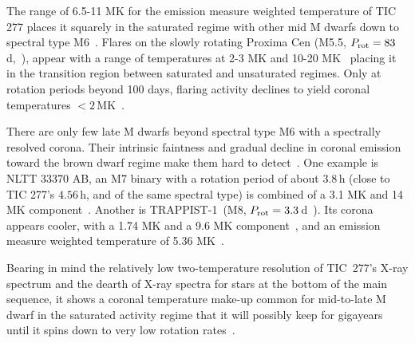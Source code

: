 \documentclass[twocolumn]{aastex631}
\begin{document}
The range of 6.5-11 MK for the emission measure weighted temperature of TIC 277 places it squarely in the saturated regime with other mid M dwarfs down to spectral type M6~\citep{wright2018stellar, magaudda2020relation, stelzer2022first,robrade2005xray,raassen2003xray,paudel2021simultaneous, foster2020corona}. Flares on the slowly rotating Proxima Cen (M5.5, $P_{\rm rot} = 83\,$d,~\citealt{anglada-escude2016terrestrial}), appear with a range of temperatures at 2-3 MK and 10-20 MK~\citep{gudel2004flares, fuhrmeister2011multiwavelength, fuhrmeister2022high, howard2022mouse} placing it in the transition region between saturated and unsaturated regimes. Only at rotation periods beyond 100 days, flaring activity declines to yield coronal temperatures $<2\,$MK~\citep{wright2018stellar, foster2020corona}. 

There are only few late M dwarfs beyond spectral type M6 with a spectrally resolved corona. Their intrinsic faintness and gradual decline in coronal emission toward the brown dwarf regime make them hard to detect~\citep{berger2010simultaneous, cook2014trends, stelzer2022first}. One example is NLTT 33370 AB, an M7 binary with a rotation period of about $3.8\,$h (close to TIC 277's $4.56\,$h, and of the same spectral type) is combined of a 3.1 MK and 14 MK component~\citep{williams2015simultaneous}. Another is TRAPPIST-1~(M8, $P_{\rm rot} = 3.3\,$d~\citep{luger2017sevenplanet}). Its corona appears cooler, with a 1.74 MK and a 9.6 MK component~\citep{wheatley2017strong}, and an emission measure weighted temperature of 5.36 MK~\citep{brown2023coronal}. 

Bearing in mind the relatively low two-temperature resolution of TIC~277's X-ray spectrum and the dearth of X-ray spectra for stars at the bottom of the main sequence, it shows a coronal temperature make-up common for mid-to-late M dwarf in the saturated activity regime that it will possibly keep for gigayears until it spins down to very low rotation rates~\citep{medina2022galactic, engle2023living}. 

\end{document}
